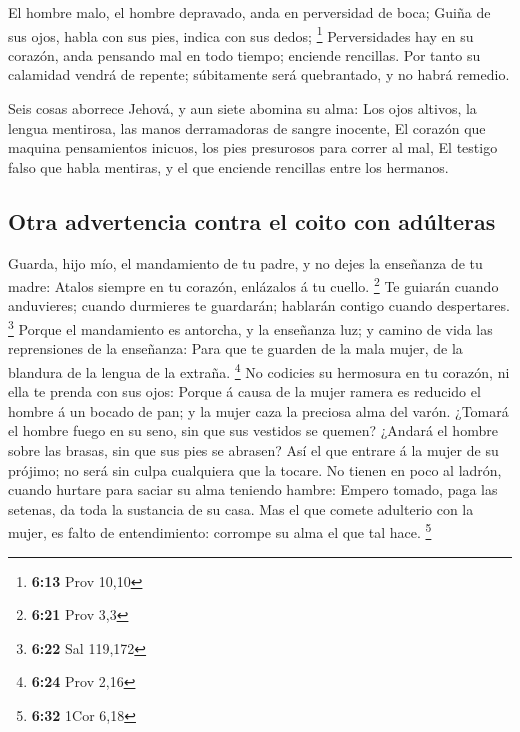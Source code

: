 El hombre malo, el hombre depravado, anda en perversidad
de boca;  Guiña de sus ojos, habla con sus pies, indica con
sus dedos; \footnote{\textbf{6:13} Prov 10,10} 
Perversidades hay en su corazón, anda pensando mal en todo tiempo;
enciende rencillas.  Por tanto su calamidad vendrá de
repente; súbitamente será quebrantado, y no habrá remedio.

 Seis cosas aborrece Jehová, y aun siete abomina su alma:
 Los ojos altivos, la lengua mentirosa, las manos
derramadoras de sangre inocente,  El corazón que maquina
pensamientos inicuos, los pies presurosos para correr al mal,
 El testigo falso que habla mentiras, y el que enciende
rencillas entre los hermanos.

\hypertarget{otra-advertencia-contra-el-coito-con-aduxfalteras}{%
\subsection{Otra advertencia contra el coito con
adúlteras}\label{otra-advertencia-contra-el-coito-con-aduxfalteras}}

 Guarda, hijo mío, el mandamiento de tu padre, y no dejes
la enseñanza de tu madre:  Atalos siempre en tu corazón,
enlázalos á tu cuello. \footnote{\textbf{6:21} Prov 3,3} 
Te guiarán cuando anduvieres; cuando durmieres te guardarán; hablarán
contigo cuando despertares. \footnote{\textbf{6:22} Sal 119,172}
 Porque el mandamiento es antorcha, y la enseñanza luz; y
camino de vida las reprensiones de la enseñanza:  Para que
te guarden de la mala mujer, de la blandura de la lengua de la extraña.
\footnote{\textbf{6:24} Prov 2,16}  No codicies su
hermosura en tu corazón, ni ella te prenda con sus ojos: 
Porque á causa de la mujer ramera es reducido el hombre á un bocado de
pan; y la mujer caza la preciosa alma del varón.  ¿Tomará
el hombre fuego en su seno, sin que sus vestidos se quemen?
 ¿Andará el hombre sobre las brasas, sin que sus pies se
abrasen?  Así el que entrare á la mujer de su prójimo; no
será sin culpa cualquiera que la tocare.  No tienen en poco
al ladrón, cuando hurtare para saciar su alma teniendo hambre:
 Empero tomado, paga las setenas, da toda la sustancia de
su casa.  Mas el que comete adulterio con la mujer, es
falto de entendimiento: corrompe su alma el que tal hace. \footnote{\textbf{6:32}
  1Cor 6,18}

